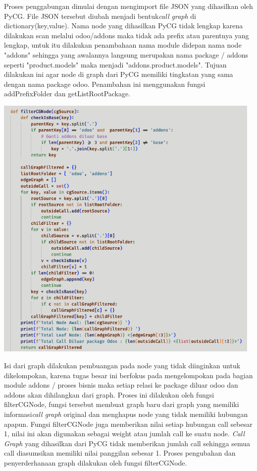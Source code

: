 Proses penggabungan dimulai dengan mengimport file JSON yang dihasilkan oleh PyCG. File JSON tersebut diubah menjadi bentuk\textit{call graph} di dictionary(key,value). Nama node yang dihasilkan PyCG tidak lengkap karena dilakukan scan melalui odoo/addons maka tidak ada prefix atau parentnya yang lengkap, untuk itu dilakukan penambahaan nama module didepan nama node "addons" sehingga yang awalannya langsung merupakan nama package / addons seperti "product.models" maka menjadi "addons.product.models". Tujuan dilakukan ini agar node di graph dari PyCG memiliki tingkatan yang sama dengan nama package odoo. Penambahan ini menggunakan fungsi addPrefixFolder dan getListRootPackage.

\begin{center}
	\includegraphics[width=13cm]{img/bab_4/ekstraksi_2.png}
	\label{fig:ekstraksi_2}
\end{center}

Isi dari graph dilakukan pembuangan pada node yang tidak diinginkan untuk dikelompokan, karena tugas besar ini berfokus pada mengelompokan pada bagian module addons / proses bisnis maka setiap relasi ke package diluar  odoo dan addons akan dihilangkan dari graph. Proses ini dilakukan oleh fungsi filterCGNode, fungsi tersebut membuat graph baru dari graph yang memiliki informasi\textit{call graph} original dan menghapus node yang tidak memiliki hubungan apapun. Fungsi filterCGNode juga memberikan nilai setiap hubungan call sebesar 1, nilai ini akan digunakan sebagai weight atau jumlah call ke suatu node. \textit{Call Graph} yang dihasilkan dari PyCG tidak memberikan jumlah call sehingga semua call diasumsikan memiliki nilai panggilan sebesar 1. Proses pengubahan dan penyerderhanaan graph dilakukan oleh fungsi filterCGNode.

